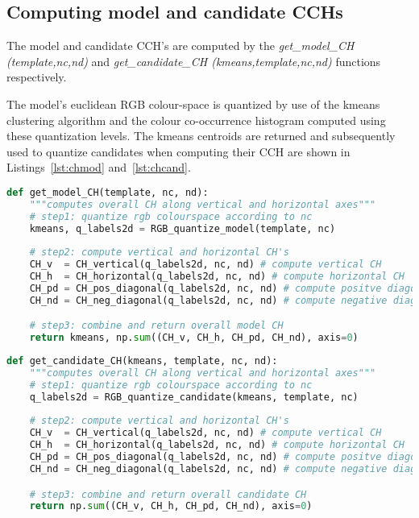 \subsection{Computing model and candidate CCHs}
The model and candidate CCH's are computed by the \textit{get\_model\_CH
(template,nc,nd)} and \textit{get\_candidate\_CH (kmeans,template,nc,nd)}
functions respectively.

The model's euclidean RGB colour-space is quantized by use of the kmeans
clustering algorithm and the colour co-occurrence histogram computed using these
quantization levels. The kmeans centroids are returned and subsequently used to
quantize candidates when computing their CCH are shown in
Listings~\ref{lst:chmod} and~\ref{lst:chcand}.

\begin{lstlisting}[language=Python, caption={Computing model CH}, captionpos=b, label={lst:chmod}]
def get_model_CH(template, nc, nd):
    """computes overall CH along vertical and horizontal axes"""
    # step1: quantize rgb colourspace according to nc
    kmeans, q_labels2d = RGB_quantize_model(template, nc)
    
    # step2: compute vertical and horizontal CH's
    CH_v  = CH_vertical(q_labels2d, nc, nd) # compute vertical CH
    CH_h  = CH_horizontal(q_labels2d, nc, nd) # compute horizontal CH
    CH_pd = CH_pos_diagonal(q_labels2d, nc, nd) # compute positve diagonal CH
    CH_nd = CH_neg_diagonal(q_labels2d, nc, nd) # compute negative diagonal CH

    # step3: combine and return overall model CH
    return kmeans, np.sum((CH_v, CH_h, CH_pd, CH_nd), axis=0)
\end{lstlisting}

\begin{lstlisting}[language=Python, caption={Computing candidate CH}, captionpos=b, label={lst:chcand}]
def get_candidate_CH(kmeans, template, nc, nd):
    """computes overall CH along vertical and horizontal axes"""
    # step1: quantize rgb colourspace according to nc
    q_labels2d = RGB_quantize_candidate(kmeans, template, nc)
    
    # step2: compute vertical and horizontal CH's
    CH_v  = CH_vertical(q_labels2d, nc, nd) # compute vertical CH
    CH_h  = CH_horizontal(q_labels2d, nc, nd) # compute horizontal CH
    CH_pd = CH_pos_diagonal(q_labels2d, nc, nd) # compute positve diagonal CH
    CH_nd = CH_neg_diagonal(q_labels2d, nc, nd) # compute negative diagonal CH

    # step3: combine and return overall candidate CH
    return np.sum((CH_v, CH_h, CH_pd, CH_nd), axis=0)
\end{lstlisting}

